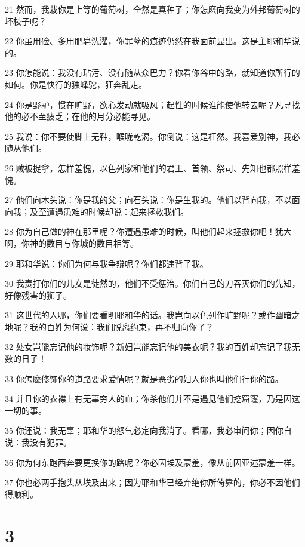 \par 21 然而，我栽你是上等的葡萄树，全然是真种子；你怎麽向我变为外邦葡萄树的坏枝子呢？
\par 22 你虽用硷、多用肥皂洗濯，你罪孽的痕迹仍然在我面前显出。这是主耶和华说的。
\par 23 你怎能说：我没有玷污、没有随从众巴力？你看你谷中的路，就知道你所行的如何。你是快行的独峰驼，狂奔乱走。
\par 24 你是野驴，惯在旷野，欲心发动就吸风；起性的时候谁能使他转去呢？凡寻找他的必不至疲乏；在他的月分必能寻见。
\par 25 我说：你不要使脚上无鞋，喉咙乾渴。你倒说：这是枉然。我喜爱别神，我必随从他们。
\par 26 贼被捉拿，怎样羞愧，以色列家和他们的君王、首领、祭司、先知也都照样羞愧。
\par 27 他们向木头说：你是我的父；向石头说：你是生我的。他们以背向我，不以面向我；及至遭遇患难的时候却说：起来拯救我们。
\par 28 你为自己做的神在那里呢？你遭遇患难的时候，叫他们起来拯救你吧！犹大啊，你神的数目与你城的数目相等。
\par 29 耶和华说：你们为何与我争辩呢？你们都违背了我。
\par 30 我责打你们的儿女是徒然的，他们不受惩治。你们自己的刀吞灭你们的先知，好像残害的狮子。
\par 31 这世代的人哪，你们要看明耶和华的话。我岂向以色列作旷野呢？或作幽暗之地呢？我的百姓为何说：我们脱离约束，再不归向你了？
\par 32 处女岂能忘记他的妆饰呢？新妇岂能忘记他的美衣呢？我的百姓却忘记了我无数的日子！
\par 33 你怎麽修饰你的道路要求爱情呢？就是恶劣的妇人你也叫他们行你的路。
\par 34 并且你的衣襟上有无辜穷人的血；你杀他们并不是遇见他们挖窟窿，乃是因这一切的事。
\par 35 你还说：我无辜；耶和华的怒气必定向我消了。看哪，我必审问你；因你自说：我没有犯罪。
\par 36 你为何东跑西奔要更换你的路呢？你必因埃及蒙羞，像从前因亚述蒙羞一样。
\par 37 你也必两手抱头从埃及出来；因为耶和华已经弃绝你所倚靠的，你必不因他们得顺利。

\chapter{3}

